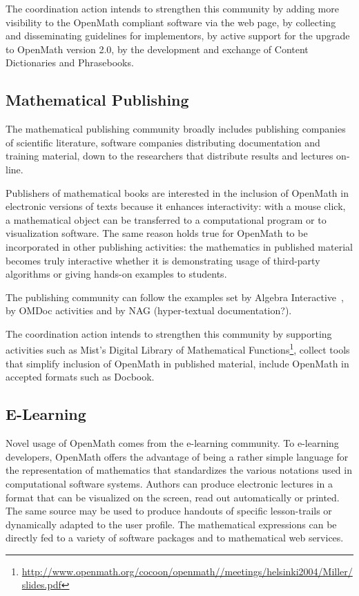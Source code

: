 \documentclass[draft]{artikel3}
\begin{document}
The coordination action intends to strengthen this community by adding
more visibility to the OpenMath compliant software via the web page,
by collecting and disseminating guidelines for implementors, by active
support for the upgrade to OpenMath version 2.0, by the development
and exchange of Content Dictionaries and Phrasebooks.

\subsection{Mathematical Publishing}
\label{sec:mpubl}

The mathematical publishing community broadly includes publishing
companies of scientific literature, software companies distributing
documentation and training material, down to the researchers that
distribute results and lectures on-line.

Publishers of mathematical books are interested in the inclusion of
OpenMath in electronic versions of texts because it enhances
interactivity: with a mouse click, a mathematical object can be
transferred to a computational program or to visualization software.
The same reason holds true for OpenMath to be incorporated in other
publishing activities: the mathematics in published material becomes
truly interactive whether it is demonstrating usage of third-party
algorithms or giving hands-on examples to students.

The publishing community can follow the examples set by Algebra
Interactive~\cite{ida}, by OMDoc activities\cite{OMDOC} and by NAG
(hyper-textual documentation?).

The coordination action intends to strengthen this community by
supporting activities such as Mist's Digital Library of Mathematical
Functions\footnote{\url{http://www.openmath.org/cocoon/openmath//meetings/helsinki2004/Miller/slides.pdf}},
collect tools that simplify inclusion of OpenMath in published
material, include OpenMath in accepted formats such as Docbook.


\subsection{E-Learning}
\label{sec:e-learn}
Novel usage of OpenMath comes from the e-learning community. To
e-learning developers, OpenMath offers the advantage of being a rather
simple language for the representation of mathematics that
standardizes the various notations used in computational software
systems. Authors can produce electronic lectures in a format that can
be visualized on the screen, read out automatically or printed. The
same source may be used to produce handouts of specific lesson-trails
or dynamically adapted to the user profile. The mathematical
expressions can be directly fed to a variety of software packages and
to mathematical web services.
\end{document}
